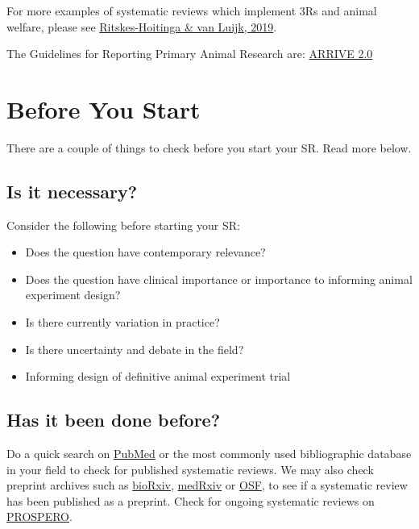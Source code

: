 \documentclass[
]{book}
\providecommand{\tightlist}{%
  \setlength{\itemsep}{0pt}\setlength{\parskip}{0pt}}
\begin{document}
For more examples of systematic reviews which implement 3Rs and animal welfare, please see \href{https://www.mdpi.com/2076-2615/9/12/1163/htm}{Ritskes-Hoitinga \& van Luijk, 2019}.

The Guidelines for Reporting Primary Animal Research are: \href{https://journals.plos.org/plosbiology/article?id=10.1371/journal.pbio.3000410}{ARRIVE 2.0}

\hypertarget{b4ustart}{%
\chapter{Before You Start}\label{b4ustart}}

There are a couple of things to check before you start your SR. Read more below.

\hypertarget{is-it-necessary}{%
\section{Is it necessary?}\label{is-it-necessary}}

Consider the following before starting your SR:

\begin{itemize}
\tightlist
\item
  Does the question have contemporary relevance?
\item
  Does the question have clinical importance or importance to informing animal experiment design?
\item
  Is there currently variation in practice?
\item
  Is there uncertainty and debate in the field?
\item
  Informing design of definitive animal experiment trial
\end{itemize}

\hypertarget{has-it-been-done-before}{%
\section{Has it been done before?}\label{has-it-been-done-before}}

Do a quick search on \href{https://pubmed.ncbi.nlm.nih.gov/}{PubMed} or the most commonly used bibliographic database in your field to check for published systematic reviews. We may also check preprint archives such as \href{https://www.biorxiv.org/}{bioRxiv}, \href{https://www.medrxiv.org/}{medRxiv} or \href{https://osf.io/}{OSF}, to see if a systematic review has been published as a preprint. Check for ongoing systematic reviews on \href{https://www.crd.york.ac.uk/prospero/}{PROSPERO}.
\end{document}
